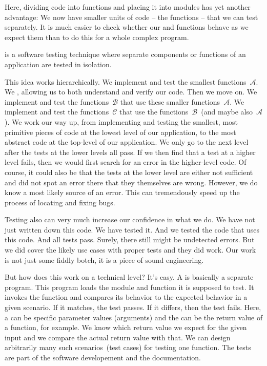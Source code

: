 Here, dividing code into functions and placing it into modules has yet another advantage:
We now have smaller units of code -- the functions -- that we can test separately.
It is much easier to check whether our  and  functions behave as we expect them than to do this for a whole complex program.%
%
\begin{definition}
\label{def:unitTesting}%
 is a software testing technique where separate components or functions of an application are tested in isolation.%
\end{definition}%
%
This idea works hierarchically.
We implement and test the smallest functions~$\mathcal{A}$.
We , allowing us to both understand and verify our code.
Then we move on.
We implement and test the functions~$\mathcal{B}$ that use these smaller functions~$\mathcal{A}$.
We implement and test the functions~$\mathcal{C}$ that use the functions~$\mathcal{B}$~(and maybe also~$\mathcal{A}$).
We work our way up, from implementing and testing the smallest, most primitive pieces of code at the lowest level of our application, to the most abstract code at the top-level of our application.
We only go to the next level after the tests at the lower levels all pass.
If we then find that a test at a higher level fails, then we would first search for an error in the higher-level code.
Of course, it could also be that the tests at the lower level are either not sufficient and did not spot an error there that they themselves are wrong.
However, we do know a most likely source of an error.
This can tremendously speed up the process of locating and fixing bugs.

Testing also can very much increase our confidence in what we do.
We have not just written down this code.
We have tested it.
And we tested the code that uses this code.
And all tests pass.
Surely, there still might be undetected errors.
But we did cover the likely use cases with proper tests and they did work.
Our work is not just some fiddly botch, it is a piece of sound engineering.

But how does this work on a technical level?
It's easy.
A  is basically a separate program.
This program loads the module and function it is supposed to test.
It invokes the function and compares its behavior to the expected behavior in a given scenario.
If it matches, the test passes.
If it differs, then the test fails.
Here, a  can be specific parameter values (arguments) and the  can be the return value of a function, for example.
We know which return value we expect for the given input and we compare the actual return value with that.
We can design arbitrarily many such scenarios~(test cases) for testing one function.
The tests are part of the software developement and the documentation.

